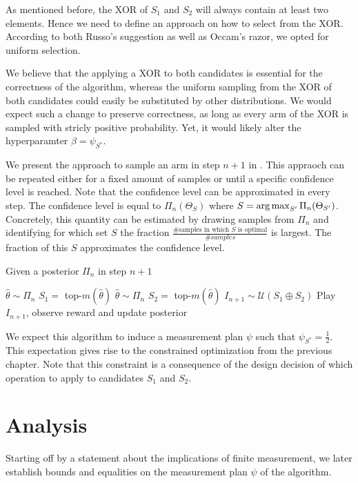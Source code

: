 As mentioned before, the XOR of $S_1$ and $S_2$ will always contain at least two elements. Hence we need to define an approach on how to select from the XOR. According to both Russo's suggestion as well as Occam's razor, we opted for uniform selection.

We believe that the applying a XOR to both candidates is essential for the correctness of the algorithm, whereas the uniform sampling from the XOR of both candidates could easily be substituted by other distributions. We would expect such a change to preserve correctness, as long as every arm of the XOR is sampled with stricly positive probability. Yet, it would likely alter the hyperparamter $\beta = \psi_{S^*}$.

We present the approach to sample an arm in step $n + 1$ in . This appraoch can be repeated either for a fixed amount of samples or until a specific confidence level is reached. Note that the confidence level can be approximated in every step. The confidence level is equal to $\Pi_n(\Theta_S)$ where $S = \operatorname*{arg\,max}_{S'} \Pi_n(\Theta_{S'})$. Concretely, this quantity can be estimated by drawing samples from $\Pi_n$ and identifying for which set $S$ the fraction $\frac{\text{\# samples in which $S$ is optimal}}{\#samples}$ is largest. The fraction of this $S$ approximates the confidence level.
\begin{algorithm}[H]
  \caption{Given a posterior $\Pi_n$ in step $n+1$}
  \label{alg:TXTS}
  \begin{algorithmic}
    \State $\hat{\theta} \sim \Pi_n$
    \State $S_1 =$ top-$m(\hat{\theta})$
    \Repeat
      \State $\hat{\theta} \sim \Pi_n$
      \State $S_2 = $ top-$m(\hat{\theta})$
    \State $I_{n+1} \sim \mathcal{U}(S_1 \oplus S_2)$
    \State Play $I_{n+1}$, observe reward and update posterior
  \end{algorithmic}
\end{algorithm}
We expect this algorithm to induce a measurement plan $\psi$ such that $\psi_{S^*} = \frac{1}{2}$. This expectation gives rise to the constrained optimization from the previous chapter. Note that this constraint is a consequence of the design decision of which operation to apply to candidates $S_1$ and $S_2$.

\section{Analysis}\label{section:analysis}
Starting off by a statement about the implications of finite measurement, we later establish bounds and equalities on the measurement plan $\psi$ of the algorithm.

